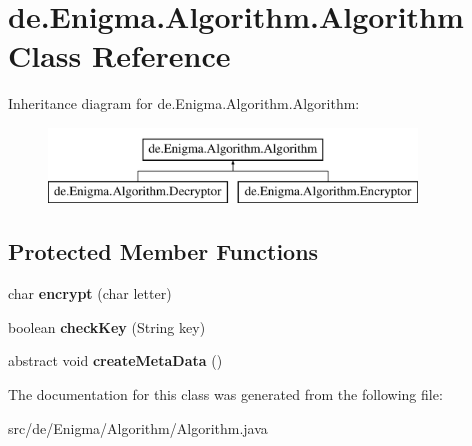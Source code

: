 \hypertarget{classde_1_1_enigma_1_1_algorithm_1_1_algorithm}{}\section{de.\+Enigma.\+Algorithm.\+Algorithm Class Reference}
\label{classde_1_1_enigma_1_1_algorithm_1_1_algorithm}
Inheritance diagram for de.\+Enigma.\+Algorithm.\+Algorithm\+:\begin{figure}[H]
\begin{center}
\leavevmode
\includegraphics[height=2.000000cm]{classde_1_1_enigma_1_1_algorithm_1_1_algorithm}
\end{center}
\end{figure}
\subsection*{Protected Member Functions}
\begin{DoxyCompactItemize}
\item 
\mbox{\label{classde_1_1_enigma_1_1_algorithm_1_1_algorithm_abf73078c3a282239deb76369616eec3d}} 
char {\bfseries encrypt} (char letter)
\item 
\mbox{\label{classde_1_1_enigma_1_1_algorithm_1_1_algorithm_afbfbc4d553d81aadd6daa86a10e06958}} 
boolean {\bfseries check\+Key} (String key)
\item 
\mbox{\label{classde_1_1_enigma_1_1_algorithm_1_1_algorithm_ae5019b8fe67a27bb68e4d3b3eac259eb}} 
abstract void {\bfseries create\+Meta\+Data} ()
\end{DoxyCompactItemize}


The documentation for this class was generated from the following file\+:\begin{DoxyCompactItemize}
\item 
src/de/\+Enigma/\+Algorithm/Algorithm.\+java\end{DoxyCompactItemize}
